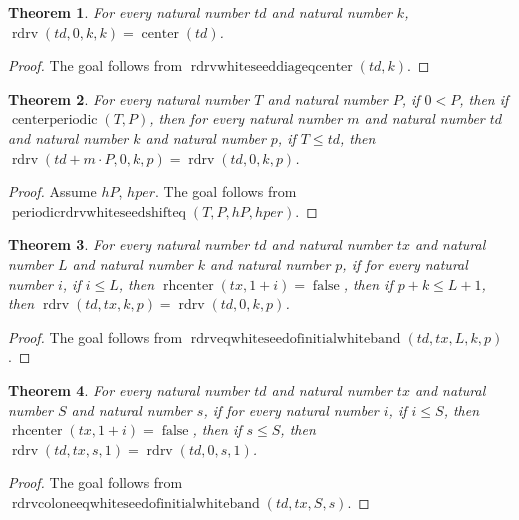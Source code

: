 \documentclass[11pt]{article}
\newtheorem{theorem}{Theorem}[section]
\theoremstyle{definition}
\begin{document}
\begin{theorem}
\label{ll:paper:rdrv-white-seed-diag-eq-center}
For every natural number \(td\) and natural number \(k\), \(\operatorname{rdrv}(td, 0, k, k) = \operatorname{center}(td)\).
\end{theorem}
\begin{proof}
The goal follows from \(\operatorname{rdrvwhiteseeddiageqcenter}(td, k)\).
\end{proof}
\begin{theorem}
\label{ll:paper:periodic-rdrv-white-seed-shift-eq}
For every natural number \(T\) and natural number \(P\), if \(0 < P\), then if \(\operatorname{centerperiodic}(T, P)\), then for every natural number \(m\) and natural number \(td\) and natural number \(k\) and natural number \(p\), if \(T \le td\), then \(\operatorname{rdrv}(td + m \cdot P, 0, k, p) = \operatorname{rdrv}(td, 0, k, p)\).
\end{theorem}
\begin{proof}
Assume \(hP\), \(hper\).
The goal follows from \(\operatorname{periodicrdrvwhiteseedshifteq}(T, P, hP, hper)\).
\end{proof}
\begin{theorem}
\label{ll:paper:rdrv-eq-white-seed-of-initial-white-band}
For every natural number \(td\) and natural number \(tx\) and natural number \(L\) and natural number \(k\) and natural number \(p\), if for every natural number \(i\), if \(i \le L\), then \(\operatorname{rhcenter}(tx, 1 + i) = \operatorname{false}\), then if \(p + k \le L + 1\), then \(\operatorname{rdrv}(td, tx, k, p) = \operatorname{rdrv}(td, 0, k, p)\).
\end{theorem}
\begin{proof}
The goal follows from \(\operatorname{rdrveqwhiteseedofinitialwhiteband}(td, tx, L, k, p)\).
\end{proof}
\begin{theorem}
\label{ll:paper:rdrv-col-one-eq-white-seed-of-initial-white-band}
For every natural number \(td\) and natural number \(tx\) and natural number \(S\) and natural number \(s\), if for every natural number \(i\), if \(i \le S\), then \(\operatorname{rhcenter}(tx, 1 + i) = \operatorname{false}\), then if \(s \le S\), then \(\operatorname{rdrv}(td, tx, s, 1) = \operatorname{rdrv}(td, 0, s, 1)\).
\end{theorem}
\begin{proof}
The goal follows from \(\operatorname{rdrvcoloneeqwhiteseedofinitialwhiteband}(td, tx, S, s)\).
\end{proof}
\end{document}
